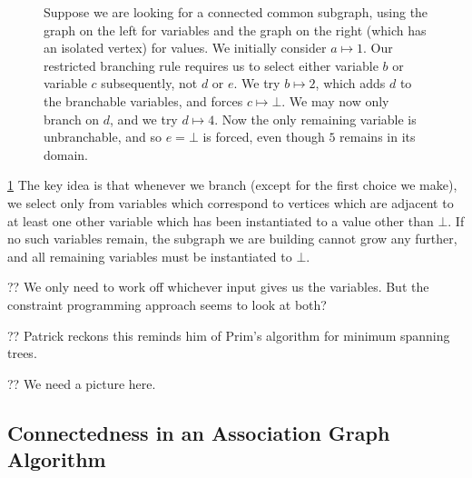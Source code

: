 \documentclass{llncs}
\begin{document}
\begin{figure}[tb]

    \caption{Suppose we are looking for a connected common subgraph, using the graph on the left
        for variables and the graph on the right (which has an isolated vertex) for values. We
        initially consider $a \mapsto 1$. Our restricted branching rule requires us to select either variable
        $b$ or variable $c$ subsequently, not $d$ or $e$. We try $b \mapsto 2$, which adds $d$
        to the branchable variables, and forces $c \mapsto \bot$. We may now only branch on $d$, and
        we try $d \mapsto 4$. Now the only remaining variable is unbranchable, and so $e = \bot$ is forced, even
        though $5$ remains in its domain.}\label{figure:restricted}
\end{figure}

\cref{figure:restricted} The key idea is that whenever we branch (except for the first choice we
make), we select only from variables which correspond to vertices which are adjacent to at least one
other variable which has been instantiated to a value other than $\bot$. If no such variables
remain, the subgraph we are building cannot grow any further, and all remaining variables must be
instantiated to $\bot$.

?? We only need to work off whichever input gives us the variables. But the constraint programming
approach seems to look at both?

?? Patrick reckons this reminds him of Prim's algorithm for minimum spanning trees.

?? We need a picture here.

\subsection{Connectedness in an Association Graph Algorithm}
\end{document}
